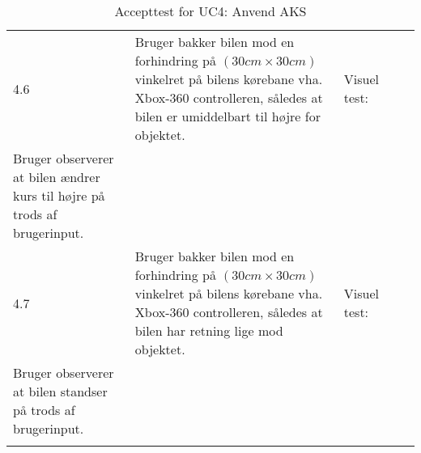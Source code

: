 \begin{longtable}{| l | >{\raggedright}X | >{\raggedright}X | >{\raggedright}X | >{\raggedright\arraybackslash}p{2.3cm} |}
	4.6 & Bruger bakker bilen mod en forhindring på $(30cm \times 30cm)$ vinkelret på bilens kørebane vha. Xbox-360 controlleren, således at bilen er umiddelbart til højre for objektet. & Visuel test: \\ Bruger observerer at bilen ændrer kurs til højre på trods af brugerinput. & ~ & ~\\ \hline
	
	4.7 & Bruger bakker bilen mod en forhindring på $(30cm \times 30cm)$ vinkelret på bilens kørebane vha. Xbox-360 controlleren, således at bilen har retning lige mod objektet. & Visuel test: \\ Bruger observerer at bilen standser på trods af brugerinput. & ~ & ~\\\hline

\caption{Accepttest for UC4: Anvend AKS}\label{tbl:acceptuc4}
\end{longtable}